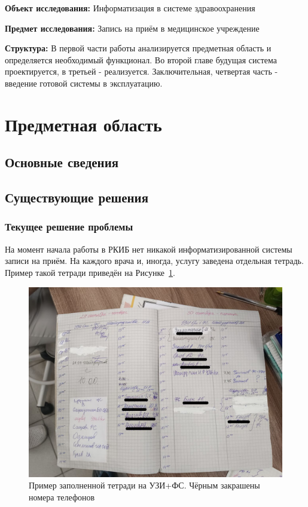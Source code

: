 \documentclass[a4paper,article]{article}
\begin{document}
        \textbf{Объект исследования:} Информатизация в системе здравоохранения

        \textbf{Предмет исследования:} Запись на приём в медицинское учреждение

        \textbf{Структура:} В первой части работы анализируется предметная область и определяется необходимый функционал. Во второй главе будущая система проектируется, в третьей - реализуется. Заключительная, четвертая часть - введение готовой системы в эксплуатацию.

        \newpage

    \section{Предметная область}

    \subsection{Основные сведения}

    \subsection{Существующие решения}

    \subsubsection{Текущее решение проблемы}

        На момент начала работы в РКИБ нет никакой информатизированной системы записи на приём. На каждого врача и, иногда, услугу заведена отдельная тетрадь. Пример такой тетради приведён на Рисунке~\ref{fig:Тетрадь на УЗИ+ФС}.

        \begin{figure}[h]

            \centering

            \includegraphics[width=0.8\linewidth]{Пример заполненной тетради на УЗИ+ФС. Чёрным закрашены номера телефонов.png}

            \caption{\centering Пример заполненной тетради на УЗИ+ФС. Чёрным закрашены номера телефонов}

            \label{fig:Тетрадь на УЗИ+ФС}

        \end{figure}
\end{document}
